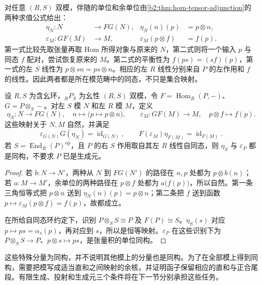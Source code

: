 对任意 \((R,S)\) 双模，伴随的单位和余单位由\cref{b2:thm:hom-tensor-adjunction}的两种求值公式给出：
\begin{align}
	\eta_N:N&\longrightarrow FG(N), &\eta_N(n)(p)&=p\otimes n,\label{b2:eq:morita-unit}\\
	\varepsilon_M:GF(M)&\longrightarrow M, &\varepsilon_M(p\otimes f)&=f(p).\label{b2:eq:morita-counit}
\end{align}
第一式比较先取张量再取 Hom 所得对象与原来的 \(N\)，第二式则将一个输入 \(p\) 与同态 \(f\) 配对，尝试恢复原来的 \(M\)。第二式的平衡性为 \(f(ps)=(sf)(p)\)，第一式的左 \(S\) 线性为 \(p\otimes sn=ps\otimes n\)。相应的左 \(R\) 线性分别来自 \(P\) 的左作用和 \(f\) 的线性。因此两者都是所在模范畴中的同态，不只是集合映射。

\begin{proposition}\label{b2:prop:morita-adjunction-maps}
	设 \(R,S\) 为含幺环，\({}_RP_S\) 为幺性 \((R,S)\) 双模，令 \(F=\operatorname{Hom}_R(P,-)\)、\(G=P\otimes_S-\)。对左 \(S\) 模 \(N\) 和左 \(R\) 模 \(M\)，定义
	\[
		\eta_N:N\longrightarrow FG(N),\quad n\longmapsto\bigl(p\longmapsto p\otimes n\bigr), \qquad \varepsilon_M:GF(M)\longrightarrow M,\quad p\otimes f\longmapsto f(p).
	\]
	这些映射关于 \(N,M\) 自然，并满足
	\begin{equation}\label{b2:eq:morita-triangles}
		\varepsilon_{G(N)}G(\eta_N)=\operatorname{id}_{G(N)},\qquad F(\varepsilon_M)\eta_{F(M)}=\operatorname{id}_{F(M)}.
	\end{equation}
	若 \(S=\operatorname{End}_R(P)^{\mathrm{op}}\)，且 \(P\) 的右 \(S\) 作用取自其左 \(R\) 线性自同态，则 \(\eta_S\) 与 \(\varepsilon_P\) 都是同构，不要求 \(P\) 已是生成元。
\end{proposition}
\begin{proof}
	若 \(b:N\rightarrow N'\)，两种从 \(N\) 到 \(FG(N')\) 的路径在 \(n,p\) 处都为 \(p\otimes b(n)\)；若 \(a:M\rightarrow M'\)，余单位的两种路径在 \(p\otimes f\) 处都为 \(a\bigl(f(p)\bigr)\)，所以自然。第一条三角恒等式把 \(p\otimes n\) 送到 \(\eta_N(n)(p)=p\otimes n\)；第二条把 \(f\) 送到函数 \(p\mapsto\varepsilon_M(p\otimes f)=f(p)\)，故都成立。

	在所给自同态环约定下，识别 \(P\otimes_SS\cong P\) 及 \(F(P)\cong S\)。\(\eta_S(s)\) 对应 \(p\mapsto ps=\alpha_s(p)\)，再对应到 \(s\)，所以是恒等映射。\(\varepsilon_P\) 在这些识别下为 \(P\otimes_SS\rightarrow P\)、\(p\otimes s\mapsto ps\)，是张量积的单位同构。
\end{proof}

这些特殊分量为同构，并不说明其他模上的分量也是同构。为了在全部模上得到同构，需要把模写成适当直和之间映射的余核，并证明函子保留相应的直和与正合尾段。有限生成、投射和生成元三个条件将在下一节分别承担这些任务。

